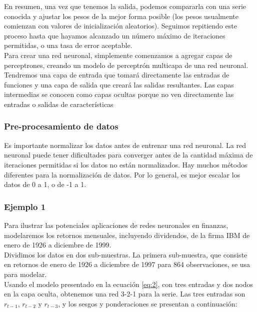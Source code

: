 	En resumen, una vez que tenemos la salida, podemos compararla con una serie conocida y ajustar los pesos de la mejor forma posible (los pesos usualmente comienzan con valores de inicializaci\'on aleatorios). Seguimos repitiendo este proceso hasta que hayamos alcanzado un n\'umero m\'aximo de iteraciones permitidas, o una tasa de error aceptable.\\
	Para crear una red neuronal, simplemente comenzamos a agregar capas de perceptrones, creando un modelo de perceptr\'on multicapa de una red neuronal. Tendremos una capa de entrada que tomar\'a directamente las entradas de funciones y una capa de salida que crear\'a las salidas resultantes. Las capas intermedias se conocen como capas ocultas porque no ven directamente las entradas o salidas de caracter\'{i}sticas
	
\subsubsection{\textbf{Pre-procesamiento de datos}}
	
	Es importante normalizar los datos antes de entrenar una red neuronal. La red neuronal puede tener dificultades para converger antes de la cantidad m\'axima de iteraciones permitidas si los datos no están normalizados. Hay muchos m\'etodos diferentes para la normalizaci\'on de datos. Por lo general, es mejor escalar los datos de 0 a 1, o de -1 a 1. 
	
\subsubsection{\textbf{Ejemplo 1} }
	
	Para ilustrar las potenciales aplicaciones de redes neuronales en finanzas, modelaremos los retornos mensuales, incluyendo dividendos, de la firma IBM de enero de 1926 a diciembre de 1999. \\
	Dividimos los datos en dos sub-muestras. La primera sub-muestra, que consiste en retornos de enero de 1926 a diciembre de 1997 para 864 observaciones, se usa para modelar. \\
	Usando el modelo presentado en la ecuaci\'on \ref{eq:2}, con tres entradas y dos nodos en la capa oculta, obtenemos una red 3-2-1 para la serie. Las tres entradas son $r_{t-1}$, $r_{t-2}$ y $r_{t-3}$, y los sesgos y ponderaciones se presentan a continuaci\'on:
	
